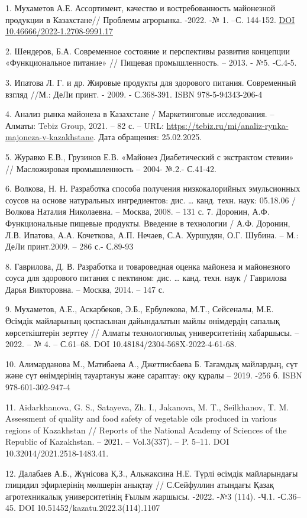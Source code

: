 \begin{references}
1. Мухаметов А.Е. Ассортимент, качество и востребованность майонезной
продукции в Казахстане// Проблемы агрорынка. -2022. -№ 1. --С.
144-152. \href{https://doi.org/10.46666/2022-1.2708-9991.17}{DOI
10.46666/2022-1.2708-9991.17}

2. Шендеров, Б.А. Современное состояние и перспективы развития концепции
«Функциональное питание» // Пищевая промышленность. -- 2013. - №5.
-С.4-5.

3. Ипатова Л. Г. и др. Жировые продукты для здорового питания.
Современный взгляд //М.: ДеЛи принт. - 2009. - С.368-391. ISBN
978-5-94343-206-4

4. Анализ рынка майонеза в Казахстане / Маркетинговые исследования. --
Алматы: Tebiz Group, 2021. -- 82 с. -- URL:
\url{https://tebiz.ru/mi/analiz-rynka-majoneza-v-kazakhstane}. Дата
обращения: 25.02.2025.

5. Журавко Е.В., Грузинов Е.В. «Майонез Диабетический с экстрактом
стевии» // Масложировая промышленность -- 2004- №.2.- С.41-42.

6. Волкова, Н. Н. Разработка способа получения низкокалорийных
эмульсионных соусов на основе натуральных ингредиентов: дис. \ldots{}
канд. техн. наук: 05.18.06 / Волкова Наталия Николаевна. -- Москва,
2008. -- 131 с.
7. Доронин, А.Ф. Функциональные пищевые продукты. Введение в технологии /
А.Ф. Доронин, Л.В. Ипатова, А.А. Кочеткова, А.П. Нечаев, С.А. Хуршудян,
О.Г. Шубина. -- М.: ДеЛи принт.2009. -- 286 с.- С.89-93

8. Гаврилова, Д. В. Разработка и товароведная оценка майонеза и
майонезного соуса для здорового питания с пектином: дис. \ldots{}
канд. техн. наук / Гаврилова Дарья Викторовна. -- Москва, 2014. -- 147
с.

9. Мухаметов, А.Е., Аскарбеков, Э.Б., Ербулекова, М.Т., Сейсеналы, М.Е.
Өсімдік майларының қоспасынан дайындалатын майлы өнімдердің сапалық
көрсеткіштерін зерттеу // Алматы технологиялық университетінің
хабаршысы. -- 2022. -- № 4. -- С.61--68. DOI
10.48184/2304-568X-2022-4-61-68.

10. Алимарданова М., Матибаева А., Джетписбаева Б. Тағамдық майлардың, сүт
және сүт өнімдерінің тауартануы және сараптау: оқу құралы -- 2019.
-256 б. ISBN 978-601-302-947-4

11. Aidarkhanova, G. S., Satayeva, Zh. I., Jakanova, M. T., Seilkhanov, T.
M. Assessment of quality and food safety of vegetable oils produced in
various regions of Kazakhstan // Reports of the National Academy of
Sciences of the Republic of Kazakhstan. -- 2021. -- Vol.3(337). -- P.
5--11. DOI 10.32014/2021.2518-1483.41.

12. Далабаев А.Б., Жүнісова Қ.З., Альжаксина Н.Е. Түрлі өсімдік
майларындағы глицидил эфирлерінің мөлшерін анықтау // С.Сейфуллин
атындағы Қазақ агротехникалық университетінің Ғылым жаршысы. -2022.
-№3 (114). -Ч.1. -С.36--45. DOI 10.51452/kazatu.2022.3(114).1107
\end{references}

